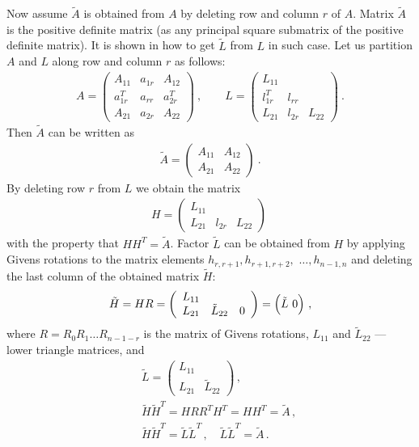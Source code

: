 \documentclass[12pt, a4paper, notitlepage]{article}
\begin{document}
Now assume $\tilde A$ is obtained from $A$ by deleting row and column $r$ of $A$. Matrix $\tilde A$ is the positive definite matrix
(as any principal square submatrix of the positive definite matrix).
It is shown in \cite{coleman89} how to get $\tilde L$ from $L$ in such case.
Let us partition $A$ and $L$ along row and column $r$ as follows:
\begin{eqnarray*}
    A = \left( \begin{array}{ccc}
          A_{11} & a_{1r} & A_{12} \\
          a_{1r}^T & a_{rr} & a_{2r}^T \\
          A_{21} & a_{2r} & A_{22}
      \end{array}
     \right) \ , \qquad
    L = \left( \begin{array}{ccc}
   L_{11}   \\
   l_{1r}^T & l_{rr}   \\
   L_{21} & l_{2r} & L_{22}
    \end{array}
     \right) \ .
\end{eqnarray*}
Then $\tilde A$ can be written as
\begin{eqnarray*}
    \tilde A = \left( \begin{array}{cc}
    A_{11}  & A_{12} \\
    A_{21}  & A_{22}
    \end{array}
     \right) \ .
\end{eqnarray*}
By deleting row $r$ from $L$ we obtain the matrix
\begin{eqnarray*}
    H = \left( \begin{array}{ccc}
  L_{11}     \\
  L_{21} & l_{2r} & L_{22}
    \end{array}
     \right) \
\end{eqnarray*}
with the property that $H H^T = \tilde A$. Factor  $\tilde L$ can be obtained from $H$ by applying Givens rotations to the matrix elements  
$h_{r, r+1}, h_{r+1, r+2},$ $\dots , h_{n-1, n}$ and deleting the last column of the obtained matrix   $\tilde H$:
\begin{eqnarray*}
    \tilde H = H R = \left( \begin{array}{ccc}
  L_{11} \\
  L_{21} &  \tilde L_{22} & 0
    \end{array}
     \right) =  \Bigl( \tilde L \ 0 \Bigr) \ ,
\end{eqnarray*}
   where $R=R_0 R_1 \dots R_{n - 1 - r}$ is the matrix of Givens rotations, $L_{11}$ and $\tilde L_{22}$ --- lower triangle matrices, and
\begin{eqnarray*}
&&  \tilde L = \left( \begin{array}{cc}
  L_{11}    \\
  L_{21} &  \tilde L_{22}
    \end{array}
     \right) \, , \\
&&	\tilde H  \tilde H^T = H R R^T H^T = H H^T = \tilde A \, , \\
&&	\tilde H  \tilde H^T = \tilde L \tilde L^T \, , \quad \tilde L \tilde L^T = \tilde A \, .
\end{eqnarray*}
\end{document}
